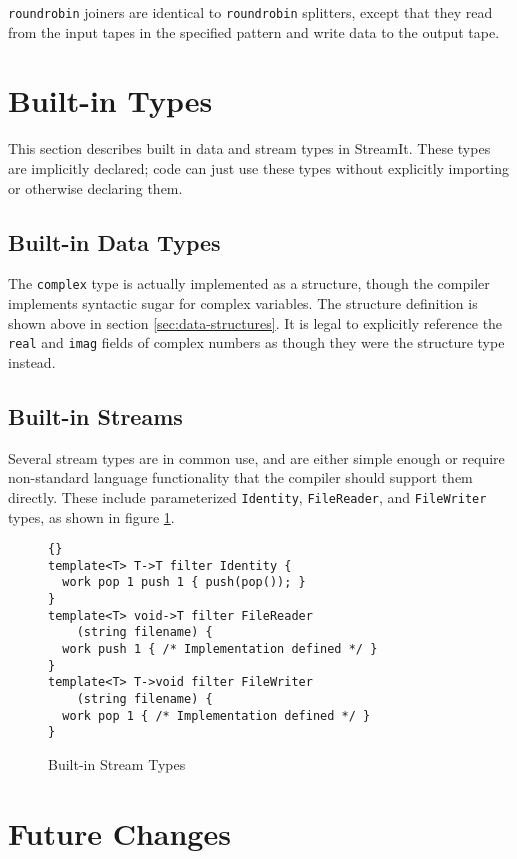 \documentclass[11pt]{article}
\begin{document}
\lstinline|roundrobin| joiners are identical to \lstinline|roundrobin|
splitters, except that they read from the input tapes in the specified
pattern and write data to the output tape.


\section{Built-in Types}

This section describes built in data and stream types in StreamIt.
These types are implicitly declared; code can just use these types
without explicitly importing or otherwise declaring them.

\subsection{Built-in Data Types}

The \lstinline|complex| type is actually implemented as a structure,
though the compiler implements syntactic sugar for complex variables.
The structure definition is shown above in section
\ref{sec:data-structures}.
It is legal to explicitly reference the \lstinline|real| and
\lstinline|imag| fields of complex numbers as though they were the
structure type instead.

\subsection{Built-in Streams}

Several stream types are in common use, and are either simple enough
or require non-standard language functionality that the compiler
should support them directly.  These include parameterized
\lstinline|Identity|, \lstinline|FileReader|, and \lstinline|FileWriter| types, as
shown in figure \ref{fig:built-in-streams}.

\begin{figure}[htbp]
    \begin{lstlisting}{}
template<T> T->T filter Identity {
  work pop 1 push 1 { push(pop()); }
}
template<T> void->T filter FileReader
    (string filename) {
  work push 1 { /* Implementation defined */ }
}
template<T> T->void filter FileWriter
    (string filename) {
  work pop 1 { /* Implementation defined */ }
}
\end{lstlisting}
    \caption{Built-in Stream Types}
    \label{fig:built-in-streams}
\end{figure}

\section{Future Changes}
\end{document}
